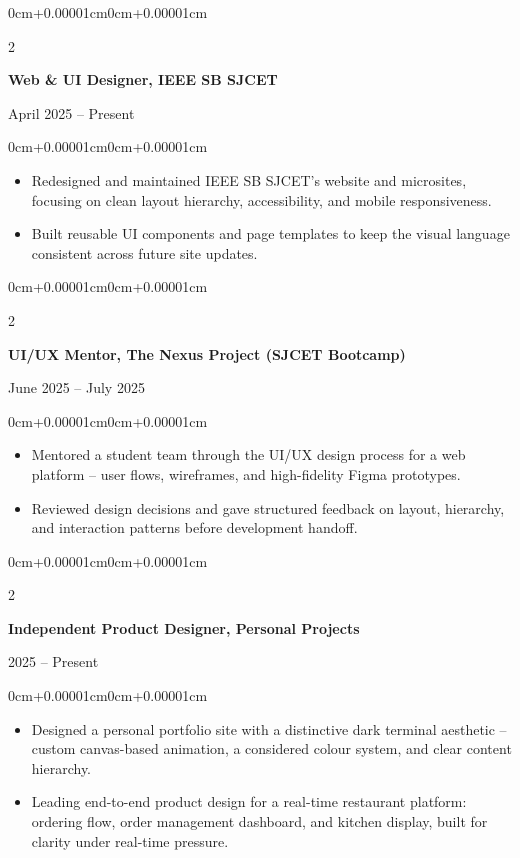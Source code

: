 \documentclass[10pt, a4paper]{article}
\newenvironment{highlights}{
    \begin{itemize}[
        topsep=0.03cm, parsep=0.03cm, partopsep=0pt,
        itemsep=0pt, leftmargin=11pt
    ]
}{
    \end{itemize}
}
\newenvironment{onecolentry}{
    \begin{adjustwidth}{0cm+0.00001cm}{0cm+0.00001cm}
}{
    \end{adjustwidth}
}
\newenvironment{twocolentry}[2][]{
    \onecolentry
    \def\secondColumn{#2}
    \setcolumnwidth{\fill, 4.3cm}
    \begin{paracol}{2}
}{
    \switchcolumn \raggedleft \small\color{SoftGray}\secondColumn
    \end{paracol}
    \endonecolentry
}
\begin{document}
\vspace{0.02cm}

\begin{twocolentry}{April 2025 -- Present}
    \textbf{Web \& UI Designer, IEEE SB SJCET}
\end{twocolentry}
\vspace{0.02cm}
\begin{onecolentry}
    \begin{highlights}
        \item Redesigned and maintained IEEE SB SJCET's website and microsites, focusing on clean layout hierarchy, accessibility, and mobile responsiveness.
        \item Built reusable UI components and page templates to keep the visual language consistent across future site updates.
    \end{highlights}
\end{onecolentry}

\vspace{0.02cm}

\begin{twocolentry}{June 2025 -- July 2025}
    \textbf{UI/UX Mentor, The Nexus Project (SJCET Bootcamp)}
\end{twocolentry}
\vspace{0.02cm}
\begin{onecolentry}
    \begin{highlights}
        \item Mentored a student team through the UI/UX design process for a web platform -- user flows, wireframes, and high-fidelity Figma prototypes.
        \item Reviewed design decisions and gave structured feedback on layout, hierarchy, and interaction patterns before development handoff.
    \end{highlights}
\end{onecolentry}

\vspace{0.02cm}

\begin{twocolentry}{2025 -- Present}
    \textbf{Independent Product Designer, Personal Projects}
\end{twocolentry}
\vspace{0.02cm}
\begin{onecolentry}
    \begin{highlights}
        \item Designed a personal portfolio site with a distinctive dark terminal aesthetic -- custom canvas-based animation, a considered colour system, and clear content hierarchy.
        \item Leading end-to-end product design for a real-time restaurant platform: ordering flow, order management dashboard, and kitchen display, built for clarity under real-time pressure.
    \end{highlights}
\end{onecolentry}
\end{document}
